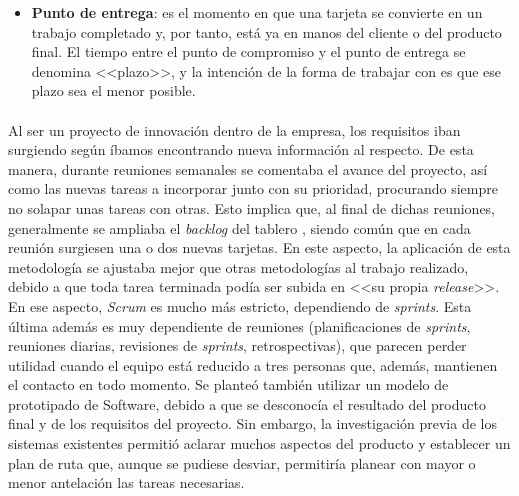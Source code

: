 \documentclass{subfiles}
\begin{document}
\begin{itemize}
            \item {\textbf{Punto de entrega}: es el momento en que una tarjeta se convierte en un trabajo completado y, por tanto, está ya en manos del cliente o del producto final. El tiempo entre el punto de compromiso y el punto de entrega se denomina <<plazo>>, y la intención de la forma de trabajar con \Kanban es que ese plazo sea el menor posible.}
        \end{itemize}
        
        \paragraph{}
        {Al ser un proyecto de innovación dentro de la empresa, los requisitos iban surgiendo según íbamos encontrando nueva información al respecto. De esta manera, durante reuniones semanales se comentaba el avance del proyecto, así como las nuevas tareas a incorporar junto con su prioridad, procurando siempre no solapar unas tareas con otras. Esto implica que, al final de dichas reuniones, generalmente se ampliaba el \textit{backlog} del tablero \Kanban, siendo común que en cada reunión surgiesen una o dos nuevas tarjetas. En este aspecto, la aplicación de esta metodología se ajustaba mejor que otras metodologías al trabajo realizado, debido a que toda tarea terminada podía ser subida en <<su propia \textit{release}>>. En ese aspecto, \textit{Scrum} es mucho más estricto, dependiendo de \textit{sprints}. Esta última además es muy dependiente de reuniones (planificaciones de \textit{sprints}, reuniones diarias, revisiones de \textit{sprints}, retrospectivas), que parecen perder utilidad cuando el equipo está reducido a tres personas que, además, mantienen el contacto en todo momento. Se planteó también utilizar un modelo de prototipado de Software, debido a que se desconocía el resultado del producto final y de los requisitos del proyecto. Sin embargo, la investigación previa de los sistemas existentes permitió aclarar muchos aspectos del producto y establecer un plan de ruta que, aunque se pudiese desviar, permitiría planear con mayor o menor antelación las tareas necesarias.}
\end{document}
